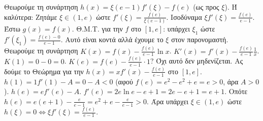 \documentclass[11pt,a4paper,modern,B]{FFExam}
\begin{document}
\begin{thema}
\begin{erwthma}
\item Θεωρούμε τη συνάρτηση $h(x) = \xi (e-1) f'(\xi) - f(e)$ (ως προς $\xi$).
Ή καλύτερα: Ζητάμε $\xi \in (1, e)$ ώστε $f'(\xi) = \frac{f(e)}{\xi(e-1)}$.
Ισοδύναμα $\xi f'(\xi) = \frac{f(e)}{e-1}$.
Έστω $g(x) = f(x)$.
Θ.Μ.Τ. για την $f$ στο $[1, e]$: υπάρχει $\xi_1$ ώστε $f'(\xi_1) = \frac{f(e)-0}{e-1}$.
Αυτό είναι κοντά αλλά έχουμε το $\xi$ στον παρονομαστή.
Θεωρούμε τη συνάρτηση $K(x) = f(x) - \frac{f(e)}{e-1} \ln x$.
$K'(x) = f'(x) - \frac{f(e)}{e-1} \frac{1}{x}$.
$K(1) = 0 - 0 = 0$.
$K(e) = f(e) - \frac{f(e)}{e-1} \cdot 1$? Όχι αυτό δεν μηδενίζεται.
Ας δούμε το Θεώρημα  για την $h(x) = x f'(x) - \frac{f(e)}{e-1}$ στο $[1, e]$.
$h(1) = 1 f'(1) - A = 0 - A < 0$ (αφού $f(e) = e^2-e^2+e = e > 0$, άρα $A > 0$).
$h(e) = e f'(e) - A$.
$f'(e) = 2e \ln e - e + 1 = 2e - e + 1 = e + 1$.
Οπότε $h(e) = e(e+1) - \frac{e}{e-1} = e^2 + e - \frac{e}{e-1} > 0$.
Άρα υπάρχει $\xi \in (1, e)$ ώστε $h(\xi)=0 \Leftrightarrow \xi f'(\xi) = \frac{f(e)}{e-1}$.
\end{erwthma}
\end{thema}
\end{document}
